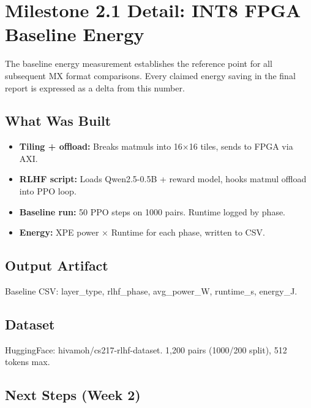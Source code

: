 \documentclass[10pt]{article}
\begin{document}
\section{Milestone 2.1 Detail: INT8 FPGA Baseline Energy}
\vspace{-0.3em}

\small
The baseline energy measurement establishes the reference point for all subsequent MX format comparisons. Every claimed energy saving in the final report is expressed as a delta from this number.

\subsection{What Was Built}
\vspace{-0.2em}

\begin{itemize}[leftmargin=*, noitemsep, topsep=0pt]
\item \textbf{Tiling + offload:} Breaks matmuls into 16×16 tiles, sends to FPGA via AXI.
\item \textbf{RLHF script:} Loads Qwen2.5-0.5B + reward model, hooks matmul offload into PPO loop.
\item \textbf{Baseline run:} 50 PPO steps on 1000 pairs. Runtime logged by phase.
\item \textbf{Energy:} XPE power × Runtime for each phase, written to CSV.
\end{itemize}
\vspace{-0.2em}

\subsection{Output Artifact}
\vspace{-0.2em}
Baseline CSV: layer\_type, rlhf\_phase, avg\_power\_W, runtime\_s, energy\_J.
\vspace{-0.2em}

\subsection{Dataset}
\vspace{-0.2em}
HuggingFace: hivamoh/cs217-rlhf-dataset. 1,200 pairs (1000/200 split), 512 tokens max.
\vspace{-0.2em}

\subsection{Next Steps (Week 2)}
\vspace{-0.2em}
\end{document}
